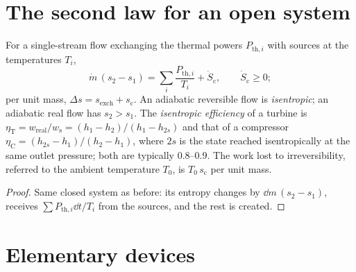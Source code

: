 \section{The second law for an open system}

\begin{theorem}\label{thm:b2:open-systems:secondlaw}
For a  single-stream flow exchanging the thermal powers
$P_{\text{th},i}$ with sources at the temperatures $T_i$,
\[
\dot m\,(s_2 - s_1) = \sum_i\frac{P_{\text{th},i}}{T_i} + \dot S_{\text{c}},
\qquad \dot S_{\text{c}} \ge 0 ;
\]
per unit mass, $\Delta s = s_{\text{exch}} + s_{\text{c}}$. An adiabatic
reversible flow is \emph{isentropic}; an adiabatic real flow has $s_2 >
s_1$. The \emph{isentropic efficiency} of
a turbine is $\eta_{\text{T}} = w_{\text{real}}/w_{\text{s}} = (h_1 - h_2)/(h_1
- h_{2s})$ and that of a compressor $\eta_{\text{C}} = (h_{2s} - h_1)/(h_2 -
h_1)$, where $2s$ is the state reached isentropically at the same
outlet pressure; both are typically $0.8$--$0.9$. The work lost to
irreversibility, referred to the ambient temperature $T_0$, is
$T_0\,s_{\text{c}}$ per unit mass.
\end{theorem}

\begin{proof}
Same closed system as before: its entropy changes by $\dd m\,(s_2 -
s_1)$, receives $\sum P_{\text{th},i}\dd t/T_i$ from the sources, and the
rest is created.
\end{proof}

\section{Elementary devices}

